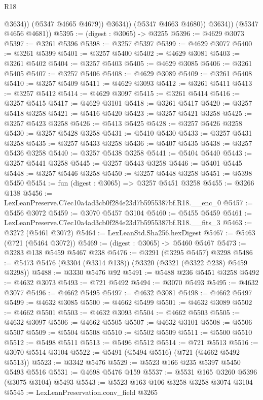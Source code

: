 \begin{lexlean}{R18}
\begin{coremodule}
                      @3634))
                  (@5347 @4665 @4679))
                @3634))
            (@5347 @4663 @4680))
          @3634))
      (@5347 @4656 @4681))
@5395 := (digest : @3065) -> @3255
@5396 := @4629 @3073
@5397 := @3261 @5396
@5398 := @3257 @5397
@5399 := @4629 @3077
@5400 := @3261 @5399
@5401 := @3257 @5400
@5402 := @4629 @3081
@5403 := @3261 @5402
@5404 := @3257 @5403
@5405 := @4629 @3085
@5406 := @3261 @5405
@5407 := @3257 @5406
@5408 := @4629 @3089
@5409 := @3261 @5408
@5410 := @3257 @5409
@5411 := @4629 @3093
@5412 := @3261 @5411
@5413 := @3257 @5412
@5414 := @4629 @3097
@5415 := @3261 @5414
@5416 := @3257 @5415
@5417 := @4629 @3101
@5418 := @3261 @5417
@5420 := @3257 @5418 @3258
@5421 := @5416 @5420
@5423 := @3257 @5421 @3258
@5425 := @3257 @5423 @3258
@5426 := @5413 @5425
@5428 := @3257 @5426 @3258
@5430 := @3257 @5428 @3258
@5431 := @5410 @5430
@5433 := @3257 @5431 @3258
@5435 := @3257 @5433 @3258
@5436 := @5407 @5435
@5438 := @3257 @5436 @3258
@5440 := @3257 @5438 @3258
@5441 := @5404 @5440
@5443 := @3257 @5441 @3258
@5445 := @3257 @5443 @3258
@5446 := @5401 @5445
@5448 := @3257 @5446 @3258
@5450 := @3257 @5448 @3258
@5451 := @5398 @5450
@5454 := fun (digest : @3065) => @3257 @5451 @3258
@5455 := @3266 @138
@5456 := LexLeanPreserve.C7ec10a4ad3cb0f284e23d7b5955387bf.R18.__enc_0
@5457 := @5456 @3072
@5459 := @3070 @5457 @3104
@5460 := @5455 @5459
@5461 := LexLeanPreserve.C7ec10a4ad3cb0f284e23d7b5955387bf.R18.__fits_3
@5463 := @3272 (@5461 @3072)
@5464 := LexLeanStd.Sha256.hexDigest
@5467 := @5463 (@721 (@5464 @3072))
@5469 := (digest : @3065) -> @5460 @5467
@5473 := @3283 @138 @5459 @5467 @238
@5476 := @3291 (@3295 @5457) @3298
@5486 := @5473 @5476 (@3304 (@3314 @138)) (@3320 (@3321 (@3322 @238) @5459 @3298))
@5488 := @3330 @5476 @92
@5491 := @5488 @236 @5451 @3258
@5492 := @4632 @3073
@5493 := @721 @5492
@5494 := @3070 @5493
@5495 := @4632 @3077
@5496 := @4662 @5495
@5497 := @4632 @3081
@5498 := @4662 @5497
@5499 := @4632 @3085
@5500 := @4662 @5499
@5501 := @4632 @3089
@5502 := @4662 @5501
@5503 := @4632 @3093
@5504 := @4662 @5503
@5505 := @4632 @3097
@5506 := @4662 @5505
@5507 := @4632 @3101
@5508 := @5506 @5507
@5509 := @5504 @5508
@5510 := @5502 @5509
@5511 := @5500 @5510
@5512 := @5498 @5511
@5513 := @5496 @5512
@5514 := @721 @5513
@5516 := @3070 @5514 @3104
@5522 := @5491 (@5494 @5516) (@721 (@4662 @5492 @5513))
@5523 := @3342 @5476
@5529 := @5523 @166 @235 @5397 @5450 @5493 @5516
@5531 := @4698 @5476 @159
@5537 := @5531 @165 @3260 @5396 (@3075 @3104) @5493
@5543 := @5523 @163 @106 @3258 @3258 @3074 @3104
@5545 := LexLeanPreservation.conv_field @3265

\end{coremodule}
\end{lexlean}
